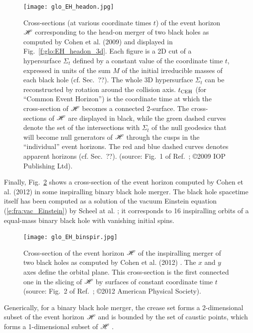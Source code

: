 \begin{figure}
\centerline{\texttt{[image: glo\_EH\_headon.jpg]}}
\caption[]{\label{f:glo:EH_headon} \footnotesize
Cross-sections (at various coordinate times $t$) of the event horizon $\mathscr{H}$ corresponding
to the head-on merger of two black holes as computed by Cohen et al. (2009) \cite{CohenPS09}
and displayed in Fig.~\ref{f:glo:EH_headon_3d}.
Each figure is a 2D cut of a hypersurface $\Sigma_t$ defined by a constant
value of the coordinate time $t$, expressed in units of the sum $M$ of the initial irreducible masses of each black
hole (cf. Sec.~??). The whole 3D hypersurface $\Sigma_t$ can be reconstructed
by rotation around the collision axis.
$t_{\rm CEH}$ (for ``Common Event Horizon'')
is the coordinate time at which the cross-section of $\mathscr{H}$ becomes a connected
2-surface.
The cross-sections of $\mathscr{H}$ are displayed
in black, while the green dashed curves denote the set of the intersections
with $\Sigma_t$ of the null geodesics that
will become null generators of $\mathscr{H}$ through the cusps in the
``individual'' event horizons.
The red and blue dashed curves denotes apparent horizons (cf. Sec.~??).
(source: Fig.~1 of Ref.~\cite{CohenPS09}; \copyright  2009 IOP Publishing Ltd).}
\end{figure}

Finally, Fig.~\ref{f:glo:EH_binspir} shows a cross-section
of the event horizon computed by Cohen et al. (2012) \cite{CohenKS12}
in some inspiralling binary black hole merger. The
black hole spacetime itself has been computed as a solution of the vacuum
Einstein equation (\ref{e:fra:vac_Einstein}) by Scheel at al. \cite{ScheeBCKMP09}; it corresponds to
16 inspiralling orbits of a equal-mass binary black hole with vanishing initial
spins.

\begin{figure}
\centerline{\texttt{[image: glo\_EH\_binspir.jpg]}}
\caption[]{\label{f:glo:EH_binspir} \footnotesize
Cross-section of the event horizon $\mathscr{H}$ of the inspiralling merger of
two black holes as computed by Cohen et al. (2012) \cite{CohenKS12}.
The $x$ and $y$ axes define the orbital plane.
This cross-section is the first connected one in the slicing of $\mathscr{H}$
by surfaces of constant coordinate time $t$
(source: Fig.~2 of Ref.~\cite{CohenKS12}; \copyright 2012 American Physical Society).}
\end{figure}

Generically, for a binary black hole merger,
the crease set forms a 2-dimensional subset of the event horizon
$\mathscr{H}$ and is bounded by the set of caustic points, which forms a 1-dimensional
subset of $\mathscr{H}$ \cite{Siino98a,Siino98b,HusaW99,CohenKS12}.



